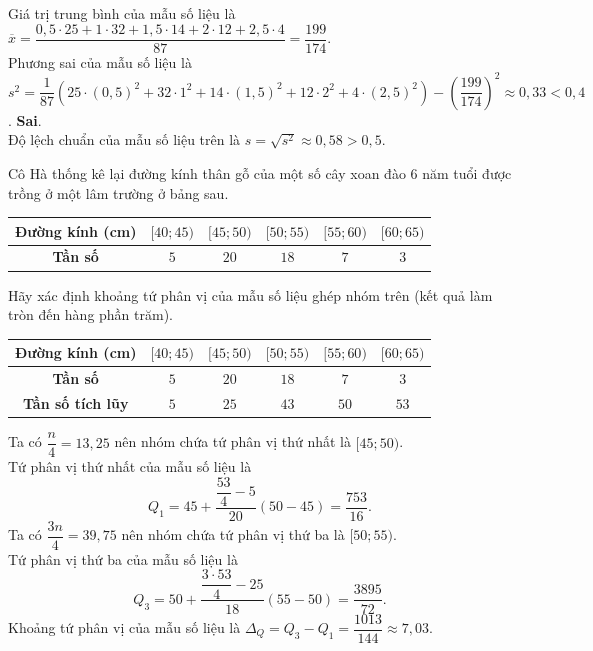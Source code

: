 \begin{ex}
{\begin{itemchoice}
\begin{center}
\begin{tabular}{|c|c|c|c|c|c|}
					\hline
				\end{tabular}
			\end{center}
			Giá trị trung bình của mẫu số liệu là\\ $\overline{x}=\dfrac{0{,}5\cdot 25+1\cdot 32+1{,5}\cdot 14+2\cdot 12+2{,5}\cdot 4}{87}=\dfrac{199}{174}$.\\
			Phương sai của mẫu số liệu là\\ $s^2=\dfrac{1}{87}\left(25\cdot (0{,}5)^2+32\cdot 1^2+14\cdot (1{,}5)^2+12\cdot 2^2+4\cdot (2{,}5)^2\right)-\left(\dfrac{199}{174}\right)^2\approx 0{,}33<0{,}4$.
			\itemch \textbf{Sai}.\\
			Độ lệch chuẩn của mẫu số liệu trên là  $s=\sqrt{s^2}\approx 0{,}58>0{,}5$.
		\end{itemchoice}
	}
\end{ex}

\begin{ex}%
	Cô Hà thống kê lại đường kính thân gỗ của một số cây xoan đào 6 năm tuổi được trồng ở một lâm trường ở bảng sau.
	\begin{center}
		\begin{tabular}{|c|c|c|c|c|c|}
			\hline
			\textbf{Đường kính (cm)} & $[40;45)$ & $[45;50)$ & $[50;55)$ & $[55;60)$ & $[60;65)$ \\ \hline
			\textbf{Tần số}          & $5$           & $20$          & $18$          & $7$           & $3$           \\ \hline
		\end{tabular}
	\end{center}
	Hãy xác định khoảng tứ phân vị của mẫu số liệu ghép nhóm trên (kết quả làm tròn đến hàng phần trăm).
	\loigiai
	{
		\begin{center}
			\begin{tabular}{|c|c|c|c|c|c|}
				\hline
				\textbf{Đường kính (cm)} & $[40;45)$ & $[45;50)$ & $[50;55)$ & $[55;60)$ & $[60;65)$ \\ \hline
				\textbf{Tần số}          & $5$           & $20$          & $18$          & $7$           & $3$           \\ \hline
				\textbf{Tần số tích lũy} & $5$ & $25$ & $43$ & $50$ & $53$\\\hline
			\end{tabular}
		\end{center}
		Ta có $\dfrac{n}{4}=13,25$ nên nhóm chứa tứ phân vị thứ nhất là $[45;50)$.\\
		Tứ phân vị thứ nhất của mẫu số liệu là
		\[Q_1=45+\dfrac{\dfrac{53}{4}-5}{20}(50-45)=\dfrac{753}{16}. \]
		Ta có $\dfrac{3n}{4}=39,75$ nên nhóm chứa tứ phân vị thứ ba là $[50;55)$.\\
		Tứ phân vị thứ ba của mẫu số liệu là
		\[Q_3=50+\dfrac{\dfrac{3\cdot 53}{4}-25}{18}(55-50)=\dfrac{3895}{72}. \]
		Khoảng tứ phân vị của mẫu số liệu là $\Delta_Q=Q_3-Q_1=\dfrac{1013}{144}\approx 7{,}03$.
	}
\end{ex}


